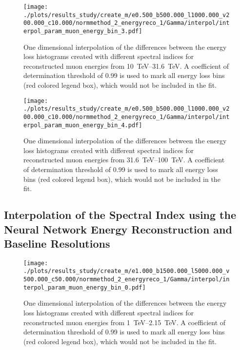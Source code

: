 \begin{figure}[H]
    \centering
    \texttt{[image: ./plots/results\_study/create\_m/e0.500\_b500.000\_l1000.000\_v200.000\_c10.000/normmethod\_2\_energyreco\_1/Gamma/interpol/interpol\_param\_muon\_energy\_bin\_3.pdf]}
    \caption{One dimensional interpolation of the differences between the energy loss histograms created with different spectral indices for reconstructed muon energies from \SIrange{10}{31.6}{TeV}. A coefficient of determination threshold of \num{0.99} is used to mark all energy loss bins (red colored legend box), which would not be included in the fit.}
    \label{fig:study_1d_interpol_mu3_nn_high_gamma}
\end{figure}

\begin{figure}[H]
    \centering
    \texttt{[image: ./plots/results\_study/create\_m/e0.500\_b500.000\_l1000.000\_v200.000\_c10.000/normmethod\_2\_energyreco\_1/Gamma/interpol/interpol\_param\_muon\_energy\_bin\_4.pdf]}
    \caption{One dimensional interpolation of the differences between the energy loss histograms created with different spectral indices for reconstructed muon energies from \SIrange{31.6}{100}{TeV}. A coefficient of determination threshold of \num{0.99} is used to mark all energy loss bins (red colored legend box), which would not be included in the fit.}
    \label{fig:study_1d_interpol_mu4_nn_high_gamma}
\end{figure}

%

\subsection*{Interpolation of the Spectral Index using the Neural Network Energy Reconstruction and Baseline Resolutions}

\begin{figure}[H]
    \centering
    \texttt{[image: ./plots/results\_study/create\_m/e1.000\_b1500.000\_l5000.000\_v500.000\_c50.000/normmethod\_2\_energyreco\_1/Gamma/interpol/interpol\_param\_muon\_energy\_bin\_0.pdf]}
    \caption{One dimensional interpolation of the differences between the energy loss histograms created with different spectral indices for reconstructed muon energies from \SIrange{1}{2.15}{TeV}. A coefficient of determination threshold of \num{0.99} is used to mark all energy loss bins (red colored legend box), which would not be included in the fit.}
    \label{fig:study_1d_interpol_mu0_nn_base_gamma}
\end{figure}

